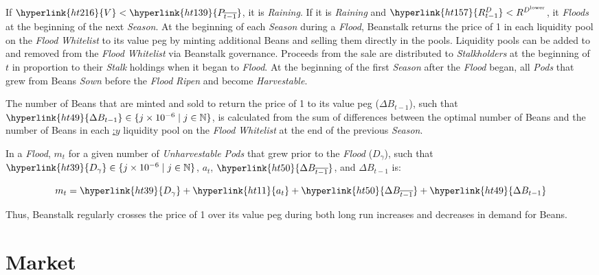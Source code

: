 \documentclass[tikz]{article}
\newcommand{\term}[1]{\textsl{#1}}
\newcommand{\Bean}{} %
\begin{document}
If $\hyperlink{ht216}{V} < \hyperlink{ht139}{P_{\overline{t-1}}}$, it is \term{Raining}. If it is \term{Raining} and $\hyperlink{ht157}{R^D_{t-1}} < R^{D^{\text{lower}}}$, it \term{Floods} at the beginning of the next \term{Season}. At the beginning of each \term{Season} during a \term{Flood}, Beanstalk returns the price of \Bean1 in each liquidity pool on the \term{Flood} \term{Whitelist} to its value peg by minting additional Beans and selling them directly in the pools. Liquidity pools can be added to and removed from the \term{Flood Whitelist} via Beanstalk governance. Proceeds from the sale are distributed to \term{Stalkholders} at the beginning of \hyperlink{ht204}{$t$} in proportion to their \term{Stalk} holdings when it began to \term{Flood}. At the beginning of the first \term{Season} after the \term{Flood} began, all \term{Pods} that grew from Beans \term{Sown} before the \term{Flood} \term{Ripen} and become \term{Harvestable}.

The number of Beans that are minted and sold to return the price of \Bean1 to its value peg (\hyperlink{ht49}{$\Delta B_{t-1}$}), such that $\hyperlink{ht49}{\Delta B_{t-1}} \in \{j \times 10^{-6} \mid j \in \mathbb{N} \}$, is calculated from the sum of differences between the optimal number of Beans and the number of Beans in each \hyperlink{ht6}{\Bean:$y$} liquidity pool on the \term{Flood} \term{Whitelist} at the end of the previous \term{Season}.

In a \term{Flood}, $m_t$ for a given number of \term{Unharvestable} \term{Pods} that grew prior to the \term{Flood} (\hyperlink{ht39}{$D_{\gamma}$}), such that $\hyperlink{ht39}{D_{\gamma}} \in \{j \times 10^{-6} \mid j \in \mathbb{N} \}$, \hyperlink{ht11}{$a_t$}, $\hyperlink{ht50}{\Delta B_{\overline{t-1}}}$, and \hyperlink{ht49}{$\Delta B_{t-1}$} is:

    $$
        m_t = \hyperlink{ht39}{D_{\gamma}} + 
            \hyperlink{ht11}{a_t} + 
            \hyperlink{ht50}{\Delta B_{\overline{t-1}}} + 
            \hyperlink{ht49}{\Delta B_{t-1}}
    $$

Thus, Beanstalk regularly crosses the price of \Bean1 over its value peg during both long run increases and decreases in demand for Beans.


\vspace*{-1.3mm}
\section{Market}
\vspace*{-1.3mm}
\end{document}
